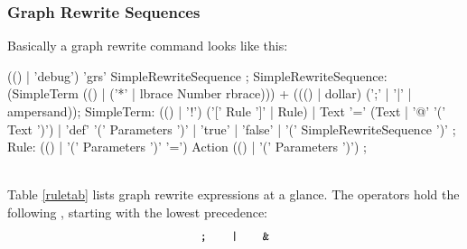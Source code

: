 \subsubsection*{Graph Rewrite Sequences}
Basically a graph rewrite command looks like this:
\makeatletter
\begin{rail}
  (() | 'debug') 'grs' SimpleRewriteSequence ;
  SimpleRewriteSequence: (SimpleTerm (() | ('*' | lbrace Number rbrace))) + ((() | dollar) (';' | '|' | ampersand));
  SimpleTerm: (() | '!') ('[' Rule ']' | Rule) |
    Text '=' (Text | '@' '(' Text ')') |
    'def' '(' Parameters ')' |
    'true' |
    'false' |
    '(' SimpleRewriteSequence ')' ;
  Rule: (() | '(' Parameters ')' '=') Action (() | '(' Parameters ')') ;
\end{rail}
\makeatother
\mbox{\quad}\\
Table \ref{ruletab} lists graph rewrite expressions at a glance. The operators hold the following , starting with the lowest precedence: 
\[ \text{\texttt{;}} \;\;\;\;\;\;\; \text{\texttt{|}} \;\;\;\;\;\;\;  \text{\texttt{\&}}\] 
\makeatletter
